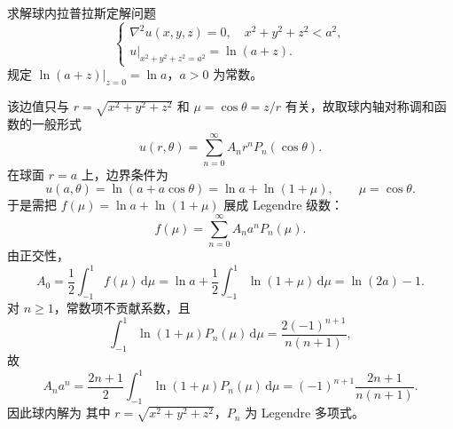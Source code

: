 \begin{question}[第3题]

求解球内拉普拉斯定解问题
\[
\begin{cases}
\nabla^{2} u(x, y, z)=0,\quad x^2+y^2+z^2<a^2,\\
\left.u\right|_{x^2+y^2+z^2=a^2}=\ln(a+z).
\end{cases}
\]
规定 $\ln(a+z)\big|_{z=0}=\ln a$，$a>0$ 为常数。

\begin{solution}

该边值只与 $r=\sqrt{x^2+y^2+z^2}$ 和 $\mu=\cos\theta=z/r$ 有关，故取球内轴对称调和函数的一般形式
\[
u(r,\theta)=\sum_{n=0}^{\infty}A_n r^n P_n(\cos\theta).
\]
在球面 $r=a$ 上，边界条件为
\[
u(a,\theta)=\ln(a+a\cos\theta)=\ln a+\ln(1+\mu),\qquad \mu=\cos\theta.
\]
于是需把 $f(\mu)=\ln a+\ln(1+\mu)$ 展成 Legendre 级数：
\[
f(\mu)=\sum_{n=0}^{\infty}A_n a^n P_n(\mu).
\]
由正交性，
\[
A_0=\frac12\int_{-1}^1 f(\mu)\,\mathrm d\mu
=\ln a+\frac12\int_{-1}^1\ln(1+\mu)\,\mathrm d\mu
=\ln(2a)-1.
\]
对 $n\ge 1$，常数项不贡献系数，且
\[
\int_{-1}^1\ln(1+\mu)P_n(\mu)\,\mathrm d\mu
=\frac{2(-1)^{n+1}}{n(n+1)},
\]
故
\[
A_n a^n
=\frac{2n+1}{2}\int_{-1}^1\ln(1+\mu)P_n(\mu)\,\mathrm d\mu
=(-1)^{n+1}\frac{2n+1}{n(n+1)}.
\]
因此球内解为
其中 $r=\sqrt{x^2+y^2+z^2}$，$P_n$ 为 Legendre 多项式。

\end{solution}
\end{question}

